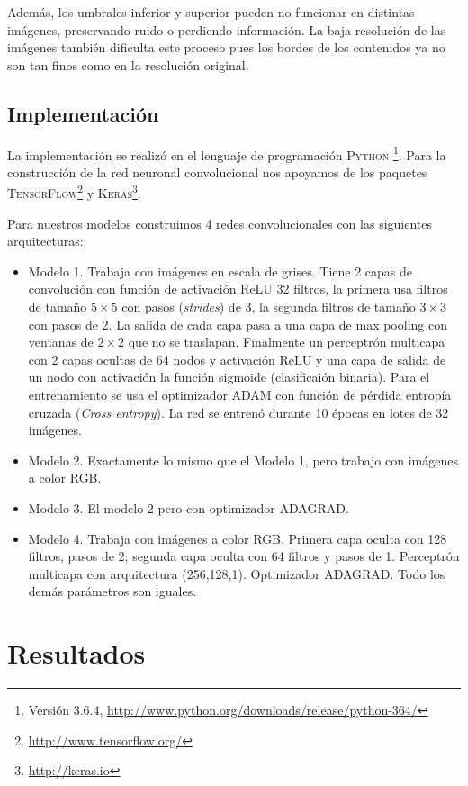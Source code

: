 \documentclass[spanish,11pt,letterpaper]{article}
\begin{document}
Además, los umbrales inferior y superior pueden no funcionar en distintas imágenes,
preservando ruido o perdiendo información. La baja resolución de las imágenes
también dificulta este proceso pues los bordes de los contenidos ya no son tan
finos como en la resolución original.

\subsection{Implementación}

La implementación se realizó en el lenguaje de programación \textsc{Python}%
\footnote{Versión 3.6.4, \url{http://www.python.org/downloads/release/python-364/}}.
Para la construcción de la red neuronal convolucional nos apoyamos de los
paquetes \textsc{TensorFlow}\footnote{\url{http://www.tensorflow.org/}} y
\textsc{Keras}\footnote{\url{http://keras.io}}.

Para nuestros modelos construimos 4 redes convolucionales con las siguientes
arquitecturas:

\begin{itemize}
\item Modelo 1. Trabaja con imágenes en escala de grises. Tiene 2 capas de convolución
con función de activación ReLU  32 filtros, la primera usa filtros de tamaño
$5 \times 5$ con pasos (\textit{strides}) de 3, la segunda filtros de tamaño
$3 \times 3$ con pasos de 2. La salida de cada capa pasa a una capa de max pooling
con ventanas de $2 \times 2$ que no se traslapan. Finalmente un perceptrón multicapa
con 2 capas ocultas de 64 nodos y activación ReLU y una capa de salida de un nodo
con activación la función sigmoide (clasificaión binaria). Para el entrenamiento
se usa el optimizador ADAM con función de pérdida entropía cruzada (\textit{Cross entropy}).
La red se entrenó durante 10 épocas en lotes de 32 imágenes.
\item Modelo 2. Exactamente lo mismo que el Modelo 1, pero trabajo con imágenes
a color RGB.
\item Modelo 3. El modelo 2 pero con optimizador ADAGRAD.
\item Modelo 4. Trabaja con imágenes a color RGB. Primera capa oculta con 128
filtros, pasos de 2; segunda capa oculta con 64 filtros y pasos de 1. Perceptrón
multicapa con arquitectura (256,128,1). Optimizador ADAGRAD. Todo los demás
parámetros son iguales.
\end{itemize}

\section{Resultados}
\end{document}
